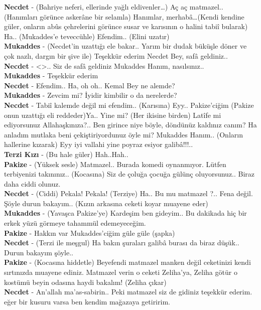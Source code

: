 \documentclass[]{book}
\begin{document}
\textbf{Necdet} - (Bahriye neferi, ellerinde yağlı eldivenler\ldots) Aç aç matmazel.. (Hanımları görünce askerâne bir selamla) Hanımlar, merhabâ\ldots(Kendi kendine güler, onların abûs çehrelerini görünce susar ve karısının o halini tabiî bularak) Ha.. (Mukaddes'e teveccühle) Efendim.. (Elini uzatır)\\
\textbf{Mukaddes} - (Necdet'in uzattığı ele bakar.. Yarım bir dudak büküşle döner ve çok nazlı, dargın bir şive ile) Teşekkür ederim Necdet Bey, safâ geldiniz..\\
\textbf{Necdet} - \textless\textgreater.. Siz de safâ geldiniz Mukaddes Hanım, nasılsınız..\\
\textbf{Mukaddes} - Teşekkür ederim\\
\textbf{Necdet} - Efendim.. Ha, oh oh.. Kemal Bey ne alemde?\\
\textbf{Mukaddes} - Zevcim mi? İyidir kimbilir o da nerelerde?\\
\textbf{Necdet} - Tabiî kalemde değil mi efendim.. (Karısına) Eyy.. Pakize'ciğim (Pakize onun uzattığı eli reddeder)Ya.. Yine mi? (Her ikisine birden) Latîfe mi ediyorsunuz Allahaşkınıza?.. Ben girince niye böyle, döndünüz kaldınız canım? Ha anladım mutlaka beni çekiştiriyordunuz öyle mi? Mukaddes Hanım.. (Onların hallerine kızarak) Eyy iyi vallahi yine poyraz esiyor galibâ!!!..\\
\textbf{Terzi Kızı} - (Bu hale güler) Hah..Hah..\\
\textbf{Pakize} - (Yüksek sesle) Matmazel.. Burada komedi oynanmıyor. Lütfen terbiyenizi takınınız.. (Kocasına) Siz de çoluğa çocuğa gülünç oluyorsunuz.. Biraz daha ciddi olunuz.\\
\textbf{Necdet} - (Ciddi) Pekala! Pekala! (Terziye) Ha.. Bu mu matmazel ?.. Fena değil. Şöyle durun bakayım.. (Kızın arkasına ceketi koyar muayene eder)\\
\textbf{Mukaddes} - (Yavaşca Pakize'ye) Kardeşim ben gideyim.. Bu dakikada hiç bir erkek yüzü görmeye tahammül edemeyeceğim.\\
\textbf{Pakize} - Hakkın var Mukaddes'ciğim güle güle (şapka)\\
\textbf{Necdet} - (Terzi ile meşgul) Ha bakın şuraları galibâ burası da biraz düşük.. Durun bakayım şöyle..\\
\textbf{Pakize} - (Kocasına hiddetle) Beyefendi matmazel manken değil ceketinizi kendi sırtınızda muayene ediniz. Matmazel verin o ceketi Zeliha'ya, Zeliha götür o kostümü beyin odasına haydi bakalım! (Zeliha çıkar)\\
\textbf{Necdet} - An'allah ma'as-sabirin.. Peki matmazel siz de gidiniz teşekkür ederim. eğer bir kusuru varsa ben kendim mağazaya getiririm.\\
\end{document}
